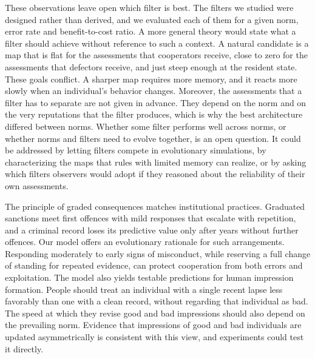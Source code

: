 \documentclass[10pt]{wlscirep}
\theoremstyle{plain}
\theoremstyle{remark}
\begin{document}
These observations leave open which filter is best. The filters we studied were designed rather than derived, and we evaluated each of them for a given norm, error rate and benefit-to-cost ratio. A more general theory would state what a filter should achieve without reference to such a context. A natural candidate is a map that is flat for the assessments that cooperators receive, close to zero for the assessments that defectors receive, and just steep enough at the resident state. These goals conflict. A sharper map requires more memory, and it reacts more slowly when an individual's behavior changes. Moreover, the assessments that a filter has to separate are not given in advance. They depend on the norm and on the very reputations that the filter produces, which is why the best architecture differed between norms. Whether some filter performs well across norms, or whether norms and filters need to evolve together, is an open question. It could be addressed by letting filters compete in evolutionary simulations, by characterizing the maps that rules with limited memory can realize, or by asking which filters observers would adopt if they reasoned about the reliability of their own assessments\cite{pandula2024,morsky2024}.

The principle of graded consequences matches institutional practices. Graduated sanctions meet first offences with mild responses that escalate with repetition\cite{ostrom1990,cox2010}, and a criminal record loses its predictive value only after years without further offences\cite{blumstein2009}. Our model offers an evolutionary rationale for such arrangements. Responding moderately to early signs of misconduct, while reserving a full change of standing for repeated evidence, can protect cooperation from both errors and exploitation. The model also yields testable predictions for human impression formation. People should treat an individual with a single recent lapse less favorably than one with a clean record, without regarding that individual as bad. The speed at which they revise good and bad impressions should also depend on the prevailing norm. Evidence that impressions of good and bad individuals are updated asymmetrically\cite{siegel2018,mendesiedlecki2013diagnostic} is consistent with this view, and experiments could test it directly.
\end{document}
